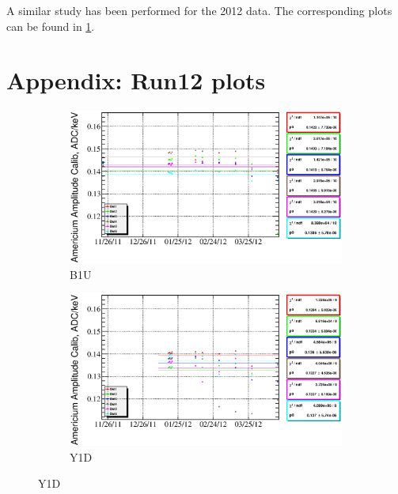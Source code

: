 \documentclass[a4paper,12pt]{article}
\begin{document}
A similar study has been performed for the 2012 data. The corresponding plots
can be found in \cref{sec:appendix_run12}.


\clearpage
\appendix
\section{Appendix: Run12 plots}
\label{sec:appendix_run12}

\begin{figure}[htb]
\begin{subfigure}[t]{0.49\textwidth}
\includegraphics[width=\textwidth]{gfx/run12_alpha/B1U/c_chAmGain_by_day_B1U.eps}
\caption{B1U}
\end{subfigure}
%
\hfill
%
\begin{subfigure}[t]{0.49\textwidth}
\includegraphics[width=\textwidth]{gfx/run12_alpha/Y1D/c_chAmGain_by_day_Y1D.eps}
\caption{Y1D}
\end{subfigure}


\end{figure}
\end{document}
